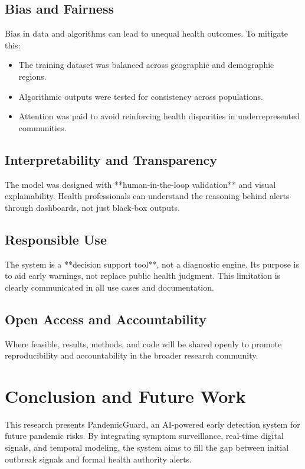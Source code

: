 \documentclass[11pt]{article}
\newcommand{\modelname}{PandemicGuard\xspace}
\begin{document}
\subsection{Bias and Fairness}
Bias in data and algorithms can lead to unequal health outcomes. To mitigate this:
\begin{itemize}
    \item The training dataset was balanced across geographic and demographic regions.
    \item Algorithmic outputs were tested for consistency across populations.
    \item Attention was paid to avoid reinforcing health disparities in underrepresented communities.
\end{itemize}

\subsection{Interpretability and Transparency}
The model was designed with **human-in-the-loop validation** and visual explainability. Health professionals can understand the reasoning behind alerts through dashboards, not just black-box outputs.

\subsection{Responsible Use}
The system is a **decision support tool**, not a diagnostic engine. Its purpose is to aid early warnings, not replace public health judgment. This limitation is clearly communicated in all use cases and documentation.

\subsection{Open Access and Accountability}
Where feasible, results, methods, and code will be shared openly to promote reproducibility and accountability in the broader research community.

\section{Conclusion and Future Work}

This research presents \modelname, an AI-powered early detection system for future pandemic risks. By integrating symptom surveillance, real-time digital signals, and temporal modeling, the system aims to fill the gap between initial outbreak signals and formal health authority alerts.
\end{document}
